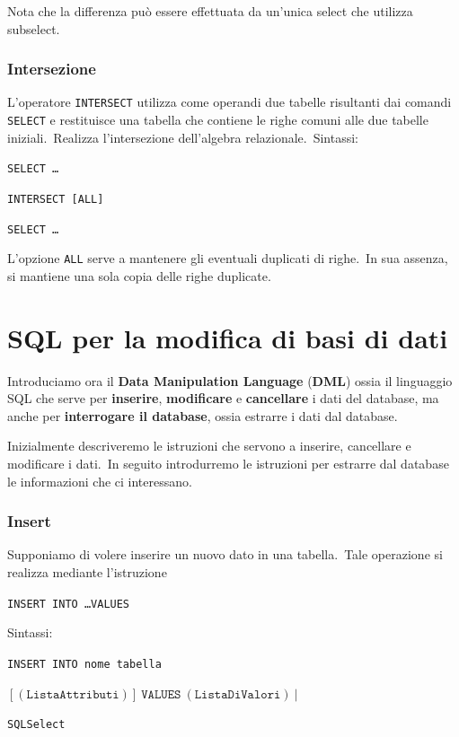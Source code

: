\noindent Nota che la differenza può essere effettuata da un'unica select che utilizza subselect.\

\subsubsection{Intersezione}

L'operatore \texttt{INTERSECT} utilizza come operandi due tabelle risultanti dai comandi \texttt{SELECT} e restituisce una tabella che contiene le righe comuni alle due tabelle iniziali.\
Realizza l'intersezione dell'algebra relazionale.\
Sintassi:
\begin{flushleft}
	\texttt{SELECT\ \dots}

	\texttt{INTERSECT [ALL]}

	\texttt{SELECT\ \dots}
\end{flushleft}
L'opzione \texttt{ALL} serve a mantenere gli eventuali duplicati di righe.\
In sua assenza, si mantiene una sola copia delle righe duplicate.

\section{SQL per la modifica di basi di dati}

Introduciamo ora il \textbf{Data Manipulation Language} (\textbf{DML}) ossia il linguaggio SQL che serve per \textbf{inserire}, \textbf{modificare} e \textbf{cancellare} i dati del database, ma anche per \textbf{interrogare il database}, ossia estrarre i dati dal database.\

Inizialmente descriveremo le istruzioni che servono a inserire, cancellare e modificare i dati.\
In seguito introdurremo le istruzioni per estrarre dal database le informazioni che ci interessano.

\subsubsection{Insert}
Supponiamo di volere inserire un nuovo dato in una tabella.\
Tale operazione si realizza mediante l'istruzione
\begin{center}
	\texttt{INSERT INTO \dots VALUES}
\end{center}
Sintassi:
\begin{flushleft}
	\texttt{INSERT INTO nome tabella}

	$\mathtt{[(ListaAttributi)]\ VALUES\ (ListaDiValori)}\ |$

	\texttt{SQLSelect}
\end{flushleft}

